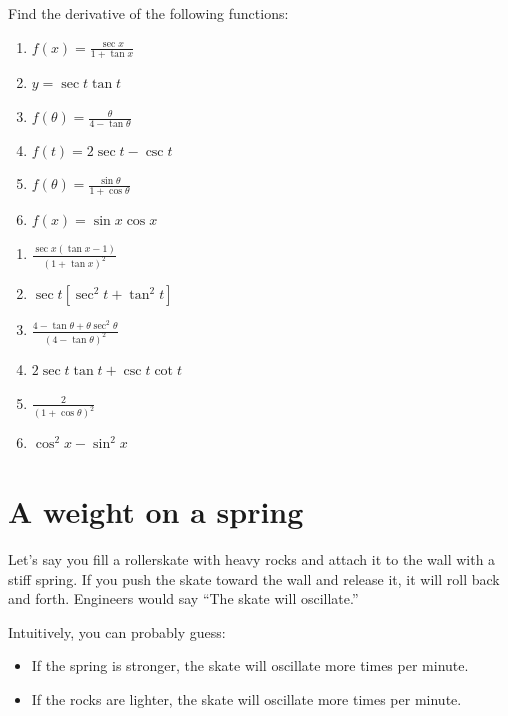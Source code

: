\begin{Exercise}[title = Derivatives of Trig Functions 2, label=trigderiv2]
    Find the derivative of the following functions:
    \begin{enumerate}
        \item $f(x) = \frac{\sec{x}}{1+\tan{x}}$
        \item $y=\sec{t}\tan{t}$
        \item $f(\theta) = \frac{\theta}{4-\tan{\theta}}$
        \item $f(t) = 2\sec{t} - \csc{t}$
        \item $f(\theta) = \frac{\sin{\theta}}{1+\cos{\theta}}$
        \item $f(x) = \sin{x}\cos{x}$
    \end{enumerate}
\end{Exercise}

\begin{Answer}
    [ref=trigderiv2]
    \begin{enumerate}
        \item $\frac{\sec{x}(\tan{x}-1)}{(1+\tan{x})^2}$
        \item $\sec{t}[\sec^2{t}+\tan^2{t}]$
        \item $\frac{4-\tan{\theta}+\theta \sec^2{\theta}}{(4-\tan{\theta})^2}$
        \item $2\sec{t}\tan{t}+\csc{t}\cot{t}$
        \item $\frac{2}{(1+\cos{\theta})^2}$
        \item $\cos^2{x} - \sin^2{x}$
    \end{enumerate}
\end{Answer}


\section{A weight on a spring}

Let's say you fill a rollerskate with heavy rocks and attach it to the
wall with a stiff spring.  If you push the skate toward the wall and
release it, it will roll back and forth. Engineers would say ``The skate will oscillate.''

Intuitively, you can probably guess:
\begin{itemize}
\item If the spring is stronger, the skate will oscillate more times per minute.
\item If the rocks are lighter, the skate will oscillate more times per minute.
\end{itemize}

